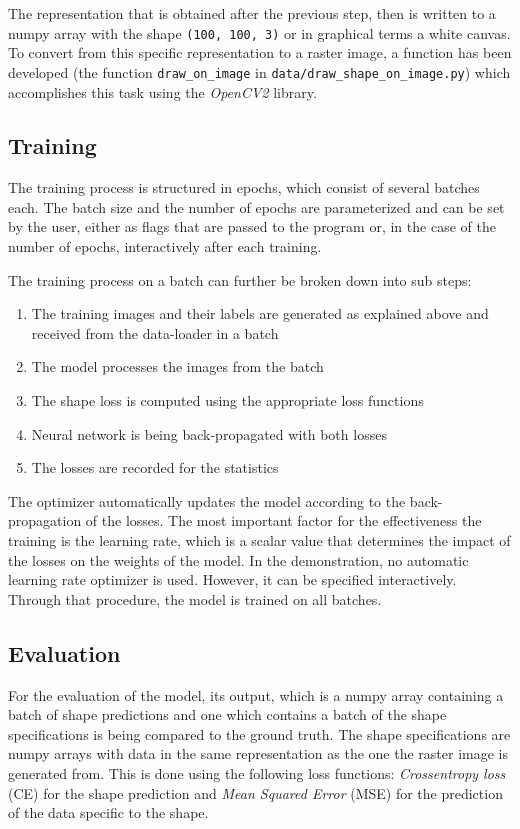 \documentclass[12pt, a4paper, titlepage]{report}
\begin{document}
The representation that is obtained after the previous step, then is written to a numpy array with the shape \lstinline{(100, 100, 3)} or in graphical terms a white canvas. To convert from this specific representation to a raster image, a function has been developed (the function \lstinline{draw_on_image} in \lstinline{data/draw_shape_on_image.py}) which accomplishes this task using the \emph{OpenCV2} library.

\subsection{Training}

The training process is structured in epochs, which consist of several batches each. The batch size and the number of epochs are parameterized and can be set by the user, either as flags that are passed to the program or, in the case of the number of epochs, interactively after each training.

The training process on a batch can further be broken down into sub steps:

\begin{enumerate}[label=\Roman*.]
   \item The training images and their labels are generated as explained above and received from the data-loader in a batch
   \item The model processes the images from the batch
   \item The shape loss is computed using the appropriate loss functions
   \item Neural network is being back-propagated with both losses
   \item The losses are recorded for the statistics
\end{enumerate}

The optimizer automatically updates the model according to the back-propagation of the losses. The most important factor for the effectiveness the training is the learning rate, which is a scalar value that determines the impact of the losses on the weights of the model. In the demonstration, no automatic learning rate optimizer is used. However, it can be specified interactively. Through that procedure, the model is trained on all batches.

\subsection{Evaluation}

For the evaluation of the model, its output, which is a numpy array containing a batch of shape predictions and one which contains a batch of the shape specifications is being compared to the ground truth. The shape specifications are numpy arrays with data in the same representation as the one the raster image is generated from.
This is done using the following loss functions: \emph{Crossentropy loss} (CE) for the shape prediction and \emph{Mean Squared Error} (MSE) for the prediction of the data specific to the shape.
\end{document}
